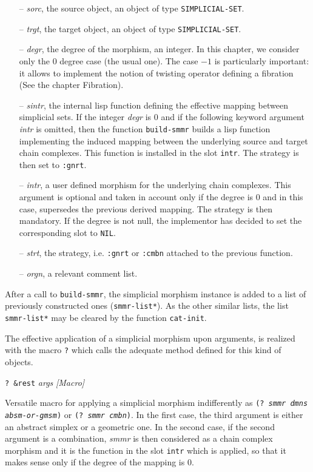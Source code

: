 \begin{itemize}
\item [--] {\em sorc}, the source object, an object of type {\tt SIMPLICIAL-SET}.
\item [--] {\em trgt}, the target object, an object of type {\tt SIMPLICIAL-SET}.
\item [--] {\em degr}, the degree of the morphism, an integer. In this chapter, we  consider only the
$0$ degree case (the usual one). The case $-1$ is particularly important: it allows to implement the notion
of twisting operator defining a fibration (See the chapter Fibration).
\item [--] {\em sintr}, the internal lisp function defining the effective mapping between simplicial sets.
If the integer {\em degr} is $0$ and if the following keyword argument {\em intr} is omitted, then 
the function {\tt build-smmr} builds a lisp function implementing the induced mapping between the
underlying source and target chain complexes. This function is installed in the slot {\tt intr}.
The strategy is then set to {\tt :gnrt}.
\item [--] {\em intr}, a user defined morphism for the underlying chain complexes. This argument is optional and
taken in account only if the degree is $0$ and in this case, supersedes the previous derived  mapping. 
The strategy is then mandatory.
If the degree is not null, the implementor has decided  to set the corresponding slot to {\tt NIL}.
\item [--] {\em strt}, the strategy, i.e. {\tt :gnrt} or {\tt :cmbn} attached to the previous function.
\item [--] {\em orgn}, a relevant comment list.
\end{itemize}

After a call to {\tt build-smmr}, the simplicial morphism instance 
is added to a list of previously constructed  ones ({\tt *smmr-list*}). 
As the other similar lists,
the list {\tt *smmr-list*} may be cleared by the function {\tt cat-init}.
\par
The effective application of a simplicial morphism upon arguments, 
is re\-a\-li\-zed with the macro {\tt ?} which  calls the adequate method
defined for this kind of objects.
\newpage
{\parindent=0mm
{\leftskip=5mm
{\tt ? \&rest} {\em args} \hfill {\em [Macro]} \par}
{\leftskip=15mm
Versatile macro for applying a simplicial morphism  indifferently
as {\tt (? {\em smmr dmns absm-or-gmsm})} or  {\tt (? {\em smmr cmbn})}. In the first case, the
third argument is either an abstract simplex or a geometric one. In the second case, if the
second argument is a combination, {\em smmr} is then considered as a chain complex  morphism and
it is the function in the slot {\tt intr} which is applied, so that it makes sense
only if the degree of the mapping is $0$. \par}
}

